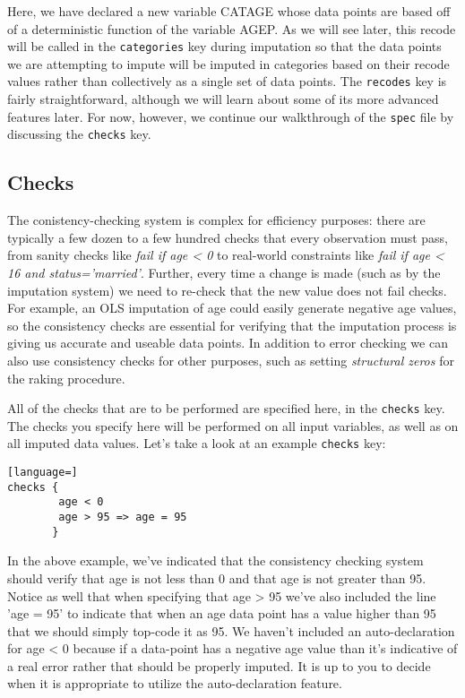\documentclass{article}
\begin{document}
Here, we have declared a new variable CATAGE whose data points are based off of a 
deterministic function of the variable AGEP. As we will see later, this recode will be called 
in the {\tt categories} key during imputation so that the data points we are attempting to 
impute will be imputed in categories based on their recode values rather than collectively 
as a single set of data points. The {\tt recodes} key is fairly straightforward, although we 
will learn about some of its more advanced features later. For now, however, we continue 
our walkthrough of the {\tt spec} file by discussing the {\tt checks} key.

\subsection{Checks}
The conistency-checking system is complex for efficiency purposes: there are typically a
few dozen to a few hundred checks that every observation must pass, from sanity checks
like {\em fail if age < 0} to real-world constraints like {\em fail if age < 16 and
status='married'}. Further, every time a change is made (such as by the imputation system)
we need to re-check that the new value does not fail checks. For example, an OLS imputation of age
could easily generate negative age values, so the consistency checks are essential
for verifying that the imputation process is giving us accurate and useable data points. In addition 
to error checking we can also use consistency checks for other purposes, such as setting 
{\em structural zeros} for the raking procedure.

All of the checks that are to be performed are specified here, in the {\tt checks} key. 
The checks you specify here will be performed on all input variables, as well as on all 
imputed data values. Let's take a look at an example {\tt checks} key:

\begin{lstlisting}[language=]
checks {
    	age < 0
        age > 95 => age = 95
       }
\end{lstlisting}

In the above example, we've indicated that the consistency checking system should verify that 
age is not less than 0 and that age is not greater than 95. Notice as well that when specifying 
that age > 95 we've also included the line 'age = 95' to indicate that when an age data point has 
a value higher than 95 that we should simply top-code it as 95. We haven't included an auto-declaration 
for age < 0 because if a data-point has a negative age value than it's indicative of a real error rather 
that should be properly imputed. It is up to you to decide when it is appropriate to utilize the 
auto-declaration feature.
\end{document}
